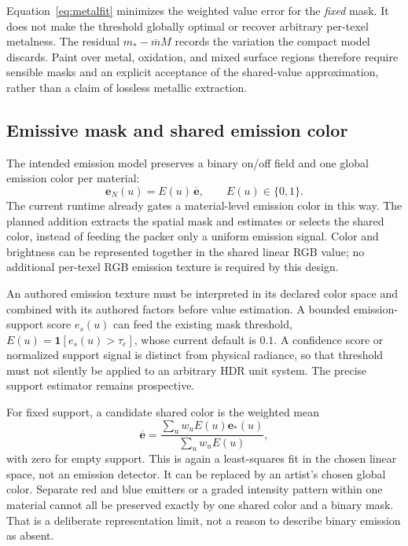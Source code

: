 \documentclass[11pt,letterpaper]{article}
\begin{document}
Equation~\eqref{eq:metalfit} minimizes the weighted value error for the \emph{fixed} mask. It does not make the threshold globally optimal or recover arbitrary per-texel metalness. The residual $m_*-\overline m M$ records the variation the compact model discards. Paint over metal, oxidation, and mixed surface regions therefore require sensible masks and an explicit acceptance of the shared-value approximation, rather than a claim of lossless metallic extraction.

\subsection{Emissive mask and shared emission color}
The intended emission model preserves a binary on/off field and one global emission color per material:
\begin{equation}
\mathbf e_N(u)=E(u)\,\overline{\mathbf e},\qquad
 E(u)\in\{0,1\}.
\label{eq:emissionmodel}
\end{equation}
The current runtime already gates a material-level emission color in this way. The planned addition extracts the spatial mask and estimates or selects the shared color, instead of feeding the packer only a uniform emission signal. Color and brightness can be represented together in the shared linear RGB value; no additional per-texel RGB emission texture is required by this design.

An authored emission texture must be interpreted in its declared color space and combined with its authored factors before value estimation. A bounded emission-support score $e_s(u)$ can feed the existing mask threshold, $E(u)=\mathbf1[e_s(u)>\tau_e]$, whose current default is $0.1$. A confidence score or normalized support signal is distinct from physical radiance, so that threshold must not silently be applied to an arbitrary HDR unit system. The precise support estimator remains prospective.

For fixed support, a candidate shared color is the weighted mean
\begin{equation}
\overline{\mathbf e}=
 \frac{\sum_u w_u E(u)\mathbf e_*(u)}{\sum_u w_u E(u)},
\label{eq:emissionfit}
\end{equation}
with zero for empty support. This is again a least-squares fit in the chosen linear space, not an emission detector. It can be replaced by an artist's chosen global color. Separate red and blue emitters or a graded intensity pattern within one material cannot all be preserved exactly by one shared color and a binary mask. That is a deliberate representation limit, not a reason to describe binary emission as absent.
\end{document}
